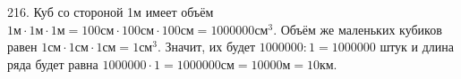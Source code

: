 216. Куб со стороной 1м имеет объём $1\text{м}\cdot1\text{м}\cdot1\text{м}=100\text{см}\cdot100\text{см}\cdot100\text{см}=1000000\text{см}^3.$ Объём же маленьких кубиков равен $1\text{см}\cdot1\text{см}\cdot1\text{см}=1\text{см}^3.$ Значит, их будет $1000000:1=1000000$ штук и длина ряда будет равна
$1000000\cdot1=1000000\text{см}=10000\text{м}=10$км.\\
